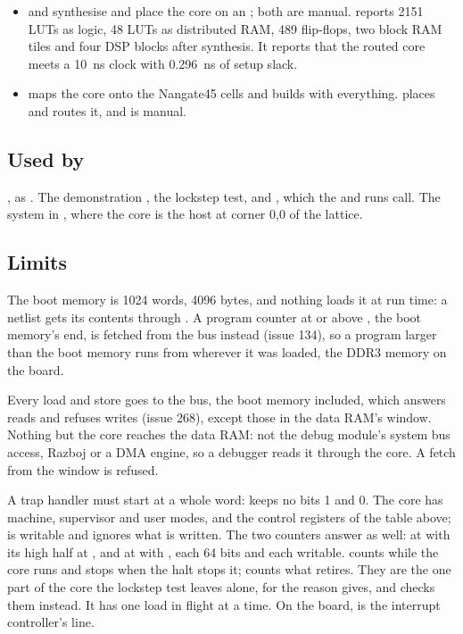 \begin{itemize}
program in the core's instruction memory, against the trace of
 under nvc and Verilator:
\allowbreak{} and
.
\item {} and
 synthesise and place the core on an
; both are manual. 
reports 2151 LUTs as logic, 48 LUTs as distributed RAM, 489
flip-flops, two block RAM tiles and four DSP blocks after synthesis. It
reports that the routed core meets a 10~ns clock with 0.296~ns of
setup slack.
\item {} maps the core onto the
Nangate45 cells and builds with everything.
\allowbreak{} places and routes it, and is
manual.
\end{itemize}

\subsection*{Used by}

, as . The demonstration
, the lockstep test, and ,
which the  and  runs call. The system in
, where the core is the host at corner 0,0 of the lattice.

\subsection*{Limits}

The boot memory is 1024 words, 4096 bytes, and nothing loads it at
run time: a netlist gets its contents through . A program
counter at or above , the boot memory's end, is
fetched from the bus instead (issue 134), so a program larger than the
boot memory runs from wherever it was loaded, the DDR3 memory on the
board.

Every load and store goes to the bus, the boot memory included, which
answers reads and refuses writes (issue 268), except those in the data
RAM's window. Nothing but the core reaches the data RAM: not the debug
module's system bus access, Razboj or a DMA engine, so a debugger
reads it through the core. A fetch from the window is refused.

A trap handler must start at a whole word:  keeps no
bits 1 and 0. The core has machine, supervisor and user modes, and
the control registers of the table above;  is writable
and ignores what is written. The two counters answer as well:
 at  with its high half at ,
and  at  with , each 64 bits
and each writable.  counts while the core runs and stops
when the halt stops it;  counts what retires. They are
the one part of the core the lockstep test leaves alone, for the
reason  gives, and
 checks them instead. It has one load in
flight at a time. On the board,  is the interrupt
controller's line.
